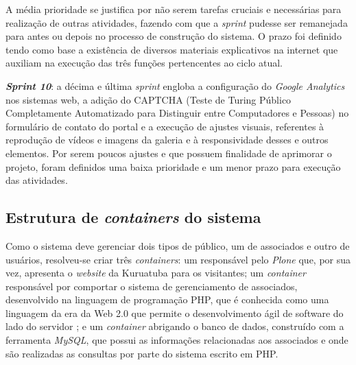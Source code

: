 A média prioridade se justifica por não serem tarefas cruciais e necessárias para realização de outras atividades, fazendo com que a \textit{sprint} pudesse ser remanejada para antes ou depois no processo de construção do sistema. O prazo foi definido tendo como base a existência de diversos materiais explicativos na internet que auxiliam na execução das três funções pertencentes ao ciclo atual.


\textbf{\textit{Sprint 10}}: a décima e última \textit{sprint} engloba a configuração do \textit{Google Analytics} nos sistemas web, a adição do CAPTCHA (Teste de Turing Público Completamente Automatizado para Distinguir entre Computadores e Pessoas) no formulário de contato do portal e a execução de ajustes visuais, referentes à reprodução de vídeos e imagens da galeria e à responsividade desses e outros elementos. Por serem poucos ajustes e que possuem finalidade de aprimorar o projeto, foram definidos uma baixa prioridade e um menor prazo para execução das atividades. 






\hspace{2.5cm}
\subsection{Estrutura de \textit{containers} do sistema}
\label{subsec:docker}
\hspace{2.5cm}

Como o sistema deve gerenciar dois tipos de público, um de associados e outro de usuários, resolveu-se criar três \textit{containers}: um responsável pelo \textit{Plone} que, por sua vez, apresenta o \textit{website} da Kuruatuba para os visitantes; um \textit{container} responsável por comportar o sistema de gerenciamento de associados, desenvolvido na linguagem de programação PHP, que é conhecida como uma linguagem da era da Web 2.0 que permite o desenvolvimento ágil de software do lado do servidor \cite{suzumura2008performance}; e um \textit{container} abrigando o banco de dados, construído com a ferramenta \textit{MySQL}, que possui as informações relacionadas aos associados e onde são realizadas as consultas por parte do sistema escrito em PHP.

